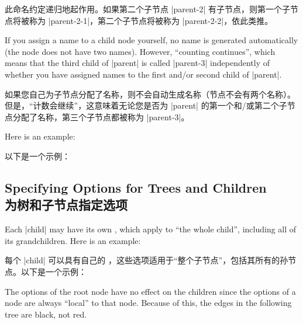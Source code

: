 此命名约定递归地起作用。如果第二个子节点 |parent-2| 有子节点，则第一个子节点将被称为 |parent-2-1|，第二个子节点将被称为 |parent-2-2|，依此类推。

If you assign a name to a child node yourself, no name is generated
automatically (the node does not have two names). However, ``counting
continues'', which means that the third child of |parent| is called |parent-3|
independently of whether you have assigned names to the first and/or second
child of |parent|.

如果您自己为子节点分配了名称，则不会自动生成名称（节点不会有两个名称）。但是，``计数会继续''，这意味着无论您是否为 |parent| 的第一个和/或第二个子节点分配了名称，第三个子节点都被称为 |parent-3|。

Here is an example:

以下是一个示例：

\begin{codeexample}[]
\end{codeexample}


\subsection{Specifying Options for Trees and Children\\为树和子节点指定选项}
\label{section-tree-options}

Each |child| may have its own , which apply to ``the whole
child'', including all of its grandchildren. Here is an example:

每个 |child| 可以具有自己的 ，这些选项适用于``整个子节点''，包括其所有的孙节点。以下是一个示例：

\begin{codeexample}[]
\end{codeexample}

The options of the root node have no effect on the children since the options
of a node are always ``local'' to that node. Because of this, the edges in the
following tree are black, not red.

